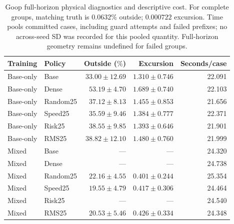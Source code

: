 \begin{table}[!ht]
\centering\small
\setlength{\tabcolsep}{5pt}\renewcommand{\arraystretch}{1.12}
\caption{Goop full-horizon physical diagnostics and descriptive cost. For complete groups, matching truth is $0.0632\%$ outside; $0.000722$ excursion. Time pools committed cases, including guard attempts and failed prefixes; no across-seed SD was recorded for this pooled quantity. Full-horizon geometry remains undefined for failed groups.}
\label{tab:goop-all-cost}
\begin{tabular}{llrrr}
\toprule
Training & Policy & Outside ($\%$) & Excursion & Seconds/case\\
\midrule
Base-only & Base & $33.00\pm12.69$ & $1.310\pm0.746$ & 22.091\\
Base-only & Dense & $53.19\pm4.70$ & $1.689\pm0.740$ & 22.103\\
Base-only & Random25 & $37.12\pm8.13$ & $1.455\pm0.853$ & 21.656\\
Base-only & Speed25 & $35.59\pm9.46$ & $1.384\pm0.777$ & 22.371\\
Base-only & Risk25 & $38.55\pm9.85$ & $1.393\pm0.646$ & 21.901\\
Base-only & RMS25 & $38.82\pm12.10$ & $1.480\pm0.760$ & 21.999\\
Mixed & Base & --- & --- & 24.320\\
Mixed & Dense & --- & --- & 24.738\\
Mixed & Random25 & $22.16\pm4.55$ & $0.401\pm0.244$ & 25.354\\
Mixed & Speed25 & $19.55\pm4.79$ & $0.417\pm0.306$ & 24.464\\
Mixed & Risk25 & --- & --- & 24.540\\
Mixed & RMS25 & $20.53\pm5.46$ & $0.426\pm0.334$ & 24.348\\
\bottomrule
\end{tabular}
\end{table}
